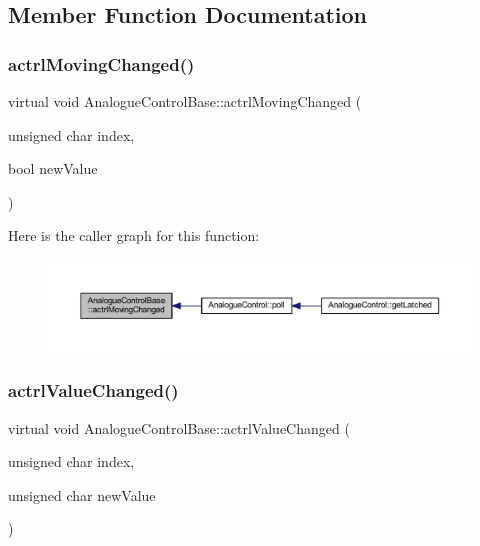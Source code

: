 \subsection{Member Function Documentation}
\mbox{\label{class_analogue_control_base_ab680f6fd45ec093200d3d78744957c1b}} 
\subsubsection{\texorpdfstring{actrl\+Moving\+Changed()}{actrlMovingChanged()}}
{\footnotesize\ttfamily virtual void Analogue\+Control\+Base\+::actrl\+Moving\+Changed (\begin{DoxyParamCaption}\item[{unsigned char}]{index,  }\item[{bool}]{new\+Value }\end{DoxyParamCaption})\hspace{0.3cm}{\ttfamily [pure virtual]}}

Here is the caller graph for this function\+:
\nopagebreak
\begin{figure}[H]
\begin{center}
\leavevmode
\includegraphics[width=350pt]{d0/d4e/class_analogue_control_base_ab680f6fd45ec093200d3d78744957c1b_icgraph}
\end{center}
\end{figure}
\mbox{\label{class_analogue_control_base_a9d18c3e299a69c909a3ad88b70524c5d}} 
\subsubsection{\texorpdfstring{actrl\+Value\+Changed()}{actrlValueChanged()}}
{\footnotesize\ttfamily virtual void Analogue\+Control\+Base\+::actrl\+Value\+Changed (\begin{DoxyParamCaption}\item[{unsigned char}]{index,  }\item[{unsigned char}]{new\+Value }\end{DoxyParamCaption})\hspace{0.3cm}{\ttfamily [pure virtual]}}

